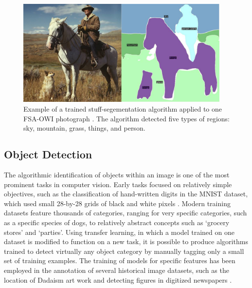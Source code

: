 \documentclass[10pt, a4paper]{article}
\begin{document}
\begin{figure}[!ht]
\begin{center}
\includegraphics[width=0.95\textwidth]{../figures/segmentation_examples_small.jpg}
\caption{Example of a trained stuff-segementation algorithm applied to
one FSA-OWI photograph \protect\cite{wu2019detectron2}. The algorithm
detected five types of regions: sky, mountain, grass, things, and person.}
\label{tab:segmentation}
\end{center}
\end{figure}

\subsection{Object Detection}

The algorithmic identification of objects within an image is one of the most
prominent tasks in computer vision. Early tasks focused on
relatively simple objectives, such as the classification of hand-written
digits in the MNIST dataset, which used small 28-by-28 grids of
black and white pixels
\cite{platt1999using}. Modern training datasets feature thousands of categories,
ranging for very specific categories, such as a specific species of dogs, to
relatively abstract concepts such as `grocery stores' and `parties'. Using
transfer learning, in which a model trained on one dataset is modified to
function on a new task, it is possible to produce algorithms trained to detect
virtually any object category by manually tagging only a small set of training
examples. The training of models for specific features has been employed in
the annotation of several historical image datasets, such as the location of
Dadaism art work \cite{thompson2017computational} and detecting figures in
digitized newspapers \cite{wevers2019visual}.
\end{document}
